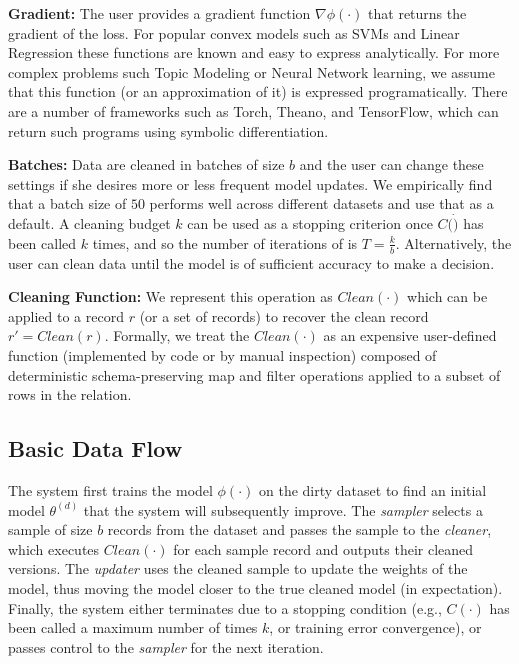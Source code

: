 \noindent\textbf{Gradient:} The user provides a gradient function $\nabla\phi(\cdot)$ that returns the gradient of the loss. For popular convex models such as SVMs and Linear Regression these functions are known and easy to express analytically. For more complex problems such Topic Modeling or Neural Network learning, we assume that this function (or an approximation of it) is expressed programatically. There are a number of frameworks such as Torch, Theano, and TensorFlow, which can return such programs using symbolic differentiation. 

\vspace{0.25em}

\noindent\textbf{Batches: } Data are cleaned in batches of size $b$ and the user can change these settings if she desires more or less frequent model updates.
We empirically find that a batch size of $50$ performs well across different datasets and use that as a default.
A cleaning budget $k$ can be used as a stopping criterion once $C(\dot)$ has been called $k$ times, and so the number of iterations of \sys is $T = \frac{k}{b}$.
Alternatively, the user can clean data until the model is of sufficient accuracy to make a decision.

\vspace{0.25em}

\noindent\textbf{Cleaning Function: } We represent this operation as $Clean(\cdot)$ which can be applied to a record $r$ (or a set of records) to recover the clean record $r' = Clean(r)$.
Formally, we treat the $Clean(\cdot)$ as an expensive user-defined function (implemented by code or by manual inspection) composed of deterministic schema-preserving \textsf{map} and \textsf{filter} operations applied to a subset of rows in the relation. 

\subsection{Basic Data Flow} \label{df}
The system first trains the model $\phi(\cdot)$ on the dirty dataset to find an initial model $\theta^{(d)}$ that the system will subsequently improve.
The {\it sampler} selects a sample of size $b$ records from the dataset and passes
the sample to the {\it cleaner}, which executes $Clean(\cdot)$ for each sample record and outputs their cleaned versions.
The \emph{updater} uses the cleaned sample to update the weights of the model, thus moving the model closer to the true cleaned model (in expectation).
Finally, the system either terminates due to a stopping condition (e.g., $C(\cdot)$ has been called a maximum number of times $k$, or training error convergence),
or passes control to the {\it sampler} for the next iteration.

